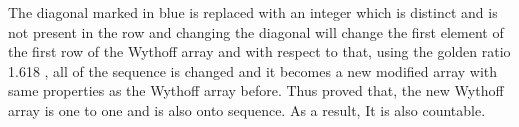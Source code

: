 \documentclass[addpoints]{exam}
\begin{document}
\begin{questions}
\begin{parts}
  \begin{solution}
  
    The diagonal marked in blue is replaced with an integer which is distinct and is not present in the row and changing the diagonal will change the first element of the first row of the Wythoff array and with respect to that, using the golden ratio 1.618 , all of the sequence is changed and it becomes a new modified array with same properties as the Wythoff array before.\newline
    Thus proved that, the new Wythoff array is one to one and is also onto sequence.
    \newline As a result, It is also countable.
  \end{solution}
\end{parts}

\end{questions}
\end{document}
